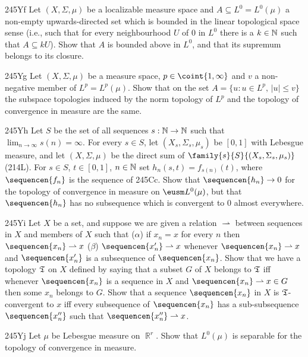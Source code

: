 {\spheader 245Yf Let $(X,\Sigma,\mu)$ be a localizable measure space and
$A\subseteq L^0=L^0(\mu)$ a non-empty upwards-directed set which is
bounded in the linear topological space sense (i.e., such that for every
neighbourhood $U$ of $0$ in $L^0$ there is a $k\in\Bbb N$ such that
$A\subseteq kU$).   Show that $A$ is bounded above in $L^0$, and that
its supremum belongs to its closure.

\spheader 245Yg Let $(X,\Sigma,\mu)$ be a measure space,
$p\in\coint{1,\infty}$ and $v$ a
non-negative member of $L^p=L^p(\mu)$.   Show that on the set
$A=\{u:u\in L^p,\,|u|\le v\}$ the subspace topologies  induced by the
norm topology of $L^p$ and the topology of convergence in measure are
the same.

\spheader 245Yh Let $S$ be the set of all sequences $s:\Bbb N\to\Bbb N$
such that $\lim_{n\to\infty}s(n)=\infty$.   For every $s\in S$, let
$(X_s,\Sigma_s,\mu_s)$ be $[0,1]$ with Lebesgue measure, and let
$(X,\Sigma,\mu)$ be the direct sum of
$\family{s}{S}{(X_s,\Sigma_s,\mu_s)}$ (214L).   For $s\in S$,
$t\in[0,1]$, $n\in\Bbb N$ set $h_n(s,t)=f_{s(n)}(t)$, where
$\sequencen{f_n}$ is the sequence of 245Cc.
Show that $\sequencen{h_n}\to 0$ for the topology of
convergence in measure on $\eusm L^0(\mu)$, but that
$\sequencen{h_n}$ has no subsequence which is convergent to $0$ almost
everywhere.

\spheader 245Yi Let $X$ be a set, and suppose we are given a relation
$\rightharpoonup$ between sequences in $X$ and members of $X$ such that
($\alpha$) if $x_n=x$ for every $n$ then $\sequencen{x_n}\rightharpoonup
x$ ($\beta$) $\sequencen{x'_n}\rightharpoonup x$ whenever
$\sequencen{x_n}\rightharpoonup x$ and $\sequencen{x'_n}$ is a
subsequence of $\sequencen{x_n}$.
Show that we have a topology $\frak T$ on $X$ defined by saying that a
subset $G$ of $X$ belongs to $\frak T$ iff whenever $\sequencen{x_n}$ is
a sequence in $X$ and $\sequencen{x_n}\rightharpoonup x\in G$ then some
$x_n$ belongs to $G$.   Show that a sequence $\sequencen{x_n}$ in $X$ is
$\frak T$-convergent to $x$ iff every subsequence of $\sequencen{x_n}$
has a sub-subsequence $\sequencen{x''_n}$ such that
$\sequencen{x''_n}\halfarrow x$.

\spheader 245Yj Let $\mu$ be Lebesgue measure on $\BbbR^r$.   Show that
$L^0(\mu)$ is separable for the topology of convergence in measure.
}%

